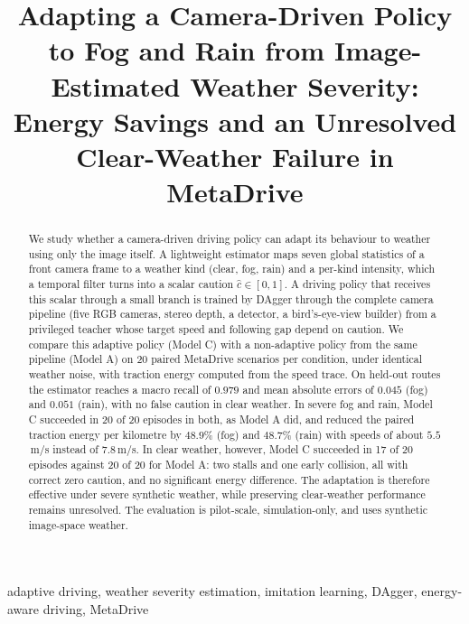 \documentclass[conference]{IEEEtran}
\newcommand{\chat}{\hat{c}}
\begin{document}
\title{Adapting a Camera-Driven Policy to Fog and Rain from Image-Estimated Weather Severity:\\
Energy Savings and an Unresolved Clear-Weather Failure in MetaDrive}

\author{
}

\maketitle

\begin{abstract}
We study whether a camera-driven driving policy can adapt its behaviour to weather using only the image itself. A lightweight estimator maps seven global statistics of a front camera frame to a weather kind (clear, fog, rain) and a per-kind intensity, which a temporal filter turns into a scalar caution $\chat\in[0,1]$. A driving policy that receives this scalar through a small branch is trained by DAgger through the complete camera pipeline (five RGB cameras, stereo depth, a detector, a bird's-eye-view builder) from a privileged teacher whose target speed and following gap depend on caution. We compare this adaptive policy (Model C) with a non-adaptive policy from the same pipeline (Model A) on 20 paired MetaDrive scenarios per condition, under identical weather noise, with traction energy computed from the speed trace. On held-out routes the estimator reaches a macro recall of $0.979$ and mean absolute errors of $0.045$ (fog) and $0.051$ (rain), with no false caution in clear weather. In severe fog and rain, Model C succeeded in 20 of 20 episodes in both, as Model A did, and reduced the paired traction energy per kilometre by $48.9\%$ (fog) and $48.7\%$ (rain) with speeds of about $5.5$\,m/s instead of $7.8$\,m/s. In clear weather, however, Model C succeeded in 17 of 20 episodes against 20 of 20 for Model A: two stalls and one early collision, all with correct zero caution, and no significant energy difference. The adaptation is therefore effective under severe synthetic weather, while preserving clear-weather performance remains unresolved. The evaluation is pilot-scale, simulation-only, and uses synthetic image-space weather.
\end{abstract}

\begin{IEEEkeywords}
adaptive driving, weather severity estimation, imitation learning, DAgger, energy-aware driving, MetaDrive
\end{IEEEkeywords}
\end{document}
